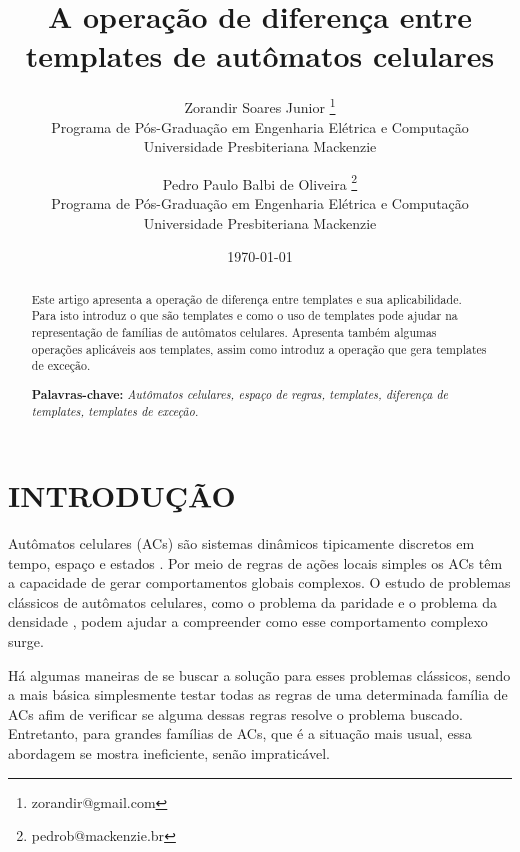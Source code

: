 \documentclass[12pt, a4paper]{article}
\title{A operação de diferença entre templates de autômatos celulares}
\author{Zorandir Soares Junior \footnote{zorandir@gmail.com} \\
 	Programa de Pós-Graduação em Engenharia Elétrica e Computação \\
	Universidade Presbiteriana Mackenzie
	\and
	Pedro Paulo Balbi de Oliveira \footnote{pedrob@mackenzie.br}  \\
 	Programa de Pós-Graduação em Engenharia Elétrica e Computação \\
	Universidade Presbiteriana Mackenzie
	}
\date{\today}
\begin{document}

\pagestyle{plain}
\renewcommand{\baselinestretch}{1.25} 
\normalsize

\maketitle

\begin{abstract}
 Este artigo apresenta a operação de diferença entre templates e sua aplicabilidade. Para isto introduz o que são templates e como o uso de templates pode ajudar na representação de famílias de autômatos celulares. Apresenta também algumas operações aplicáveis aos templates, assim como introduz a operação que gera templates de exceção.

\begin{flushleft}
{\bf Palavras-chave:} {\it Autômatos celulares, espaço de regras, templates, diferença de templates, templates de exceção.}
\end{flushleft}
\end{abstract}

\section{INTRODUÇÃO}
\label{sec:introducao}
Autômatos celulares (ACs) são sistemas dinâmicos tipicamente discretos em tempo, espaço e estados \cite{wolfram2002}. Por meio de regras de ações locais simples os ACs têm a capacidade de gerar comportamentos globais complexos. O estudo de problemas clássicos de autômatos celulares, como o problema da paridade \cite{Betel2013} e o problema da densidade \cite{deOliveira2014density}, podem ajudar a compreender como esse comportamento complexo surge.

Há algumas maneiras de se buscar a solução para esses problemas clássicos, sendo a mais básica simplesmente testar todas as regras de uma determinada família de ACs afim de verificar se alguma dessas regras resolve o problema buscado. 
Entretanto, para grandes famílias de ACs, que é a situação mais usual, essa abordagem se mostra ineficiente, senão impraticável.
\end{document}
